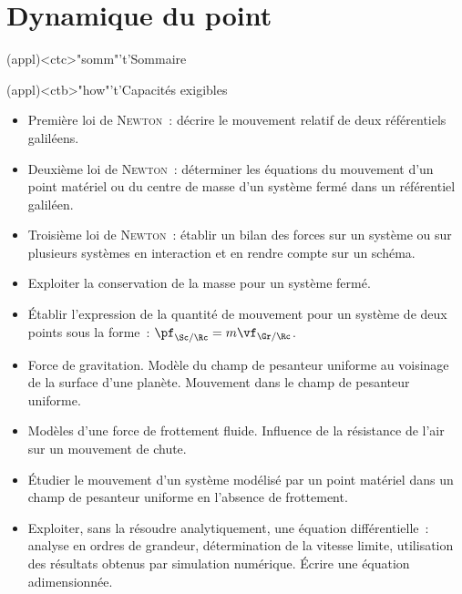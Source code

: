 \documentclass[../../main/main.tex]{subfiles}
\begin{document}
\setcounter{chapter}{1}


\chapter{Dynamique du point}

\vspace*{\fill}

\begin{tcn}(appl)<ctc>"somm"'t'{Sommaire}
	\let\item\olditem
	\vspace{-15pt}
	\minitoc
	\vspace{-25pt}
\end{tcn}

\begin{tcn}[sidebyside]
	(appl)<ctb>"how"'t'{Capacités exigibles}
	\begin{itemize}[label=\rcheck]
		\item Première loi de \textsc{Newton}~: décrire le mouvement relatif de
		      deux référentiels galiléens.
		\item Deuxième loi de \textsc{Newton}~: déterminer les équations du
		      mouvement d'un point matériel ou du centre de masse d'un système
		      fermé dans un référentiel galiléen.
		\item Troisième loi de \textsc{Newton}~: établir un bilan des forces sur
		      un système ou sur plusieurs systèmes en interaction et en rendre
		      compte sur un schéma.
		\item Exploiter la conservation de la masse pour un système fermé.
		\item Établir l'expression de la quantité de mouvement pour un système de
		      deux points sous la forme~: $\pf_{\Sc/\Rc}=m\vf_{\Gr/\Rc}$.
	\end{itemize}
	\tcblower
	\begin{itemize}[label=\rcheck]
		\item Force de gravitation. Modèle du champ de pesanteur uniforme au
		      voisinage de la surface d'une planète. Mouvement dans le champ de
		      pesanteur uniforme.
		\item Modèles d'une force de frottement fluide. Influence de la résistance
		      de l'air sur un mouvement de chute.
		\item Étudier le mouvement d'un système modélisé par un point matériel
		      dans un champ de pesanteur uniforme en l'absence de frottement.
		\item Exploiter, sans la résoudre analytiquement, une équation
		      différentielle~: analyse en ordres de grandeur, détermination de la
		      vitesse limite, utilisation des résultats obtenus par simulation
		      numérique. Écrire une équation adimensionnée.
	\end{itemize}
\end{tcn}
\end{document}
